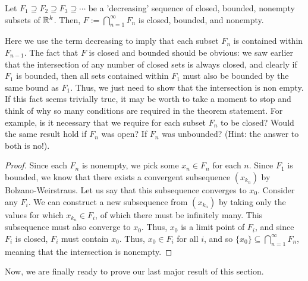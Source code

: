 \begin{thm}{}{}
Let \(F_1 \supseteq F_2 \supseteq F_3 \supseteq \cdots\) be a 'decreasing' sequence of closed, bounded, nonempty subsets of \({\mathbb R}^k\). Then, \(F := \bigcap_{n=1}^{\infty}F_n\) is closed, bounded, and nonempty.\newline 

Here we use the term decreasing to imply that each subset \(F_n\) is contained within \(F_{n - 1}\). The fact that \(F\) is closed and bounded should be obvious: we saw earlier that the intersection of any number of closed sets is always closed, and clearly if \(F_1\) is bounded, then all sets contained within \(F_1\) must also be bounded by the same bound as \(F_1\). Thus, we just need to show that the intersection is non empty. If this fact seems trivially true, it may be worth to take a moment to stop and think of why so many conditions are required in the theorem statement. For example, is it necessary that we require for each subset \(F_n\) to be closed? Would the same result hold if \(F_n\) was open? If \(F_n\) was unbounded? (Hint: the answer to both is no!).

\begin{proof}
Since each \(F_n\) is nonempty, we pick some \(x_n \in F_n\) for each \(n\). Since \(F_1\) is bounded, we know that there exists a convergent subsequence \((x_{k_n})\) by Bolzano-Weirstraus. Let us say that this subsequence converges to \(x_0\). Consider any \(F_i\). We can construct a new subsequence from \((x_{k_n})\) by taking only the values for which \(x_{k_n} \in F_i\), of which there must be infinitely many. This subsequence must also converge to \(x_0\). Thus, \(x_0\) is a limit point of \(F_i\), and since \(F_i\) is closed, \(F_i\) must contain \(x_0\). Thus, \(x_0 \in F_i\) for all \(i\), and so \( \{x_0\} \subseteq \bigcap_{n=1}^{\infty}F_n\), meaning that the intersection is nonempty.
\end{proof}

\end{thm}


Now, we are finally ready to prove our last major result of this section. \newline

